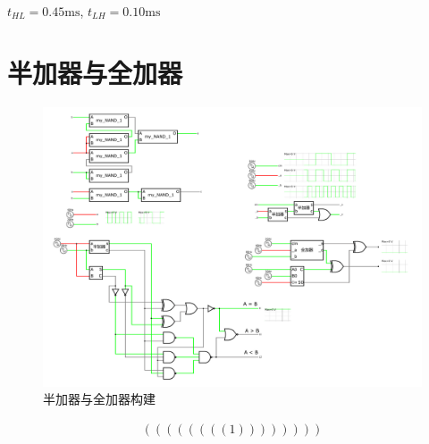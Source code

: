 \documentclass{article}
\begin{document}
$t_{HL} = 0.45 \mathrm{ms}$, $t_{LH} = 0.10 \mathrm{ms}$

\section{半加器与全加器}


\begin{figure}[htbp]
    \centering
    \includegraphics[width=1\textwidth]{半加器与全加器.pdf}
    \caption{半加器与全加器构建}
\end{figure}

\begin{align*}
    \left(\left(\left(\left(\left(\left(\left(\left(1\right)\right)\right)\right)\right)\right)\right)\right)
\end{align*}
\end{document}
